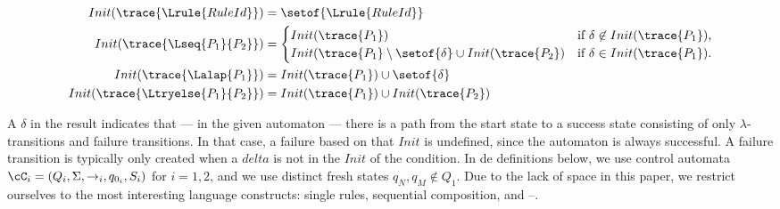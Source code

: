 \iffull
\begin{definition}
\begin{align*}
Init(\trace{\Lrule{RuleId}}) &= \setof{ \Lrule{RuleId} }\\
Init(\trace{\Lseq{P_1}{P_2}}) &= \begin{cases}
		Init(\trace{P_1}) & \text{if $\delta \not\in Init(\trace{P_1})$,}\\
		Init(\trace{P_1} \setminus \setof{\delta} \cup Init(\trace{P_2})&
				\text{if $\delta \in Init(\trace{P_1})$.}\\  
	\end{cases}\\
Init(\trace{\Lalap{P_1}}) &= Init(\trace{P_1}) \cup \setof{\delta}\\
Init(\trace{\Ltryelse{P_1}{P_2}}) &= Init(\trace{P_1}) \cup Init(\trace{P_2})\\
\end{align*}
\end{definition}
%
A $\delta$ in the result indicates that --- in the given automaton --- there is
a path from the start state to a success state consisting of only
$\lambda$-transitions and failure transitions. In that case, a failure based on
that $Init$ is undefined, since the automaton is always successful. A failure
transition is typically only created when a $delta$ is not in the $Init$ of the
condition.  \fi
%
In de definitions below, we use control automata $\cC_i = (Q_i, \Sigma,
\rightarrow_i, q_{0_i}, S_i)$ for $i=1,2$, and we use distinct fresh states
$q_N,q_M\notin Q_1$.  Due to the lack of space in this paper, we restrict
ourselves to the most interesting language constructs: single rules, sequential
composition, \alapK{} and \tryK--\elseK.
%
